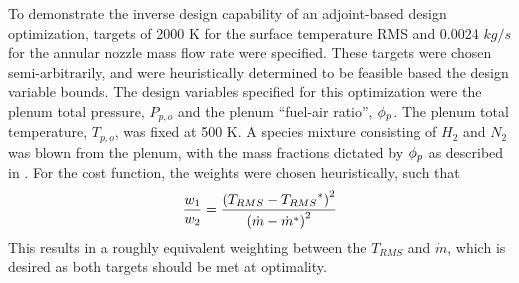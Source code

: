To demonstrate the inverse design capability of an adjoint-based design
optimization, targets of 2000 K for the surface temperature RMS and 0.0024
$kg/s$ for the annular nozzle mass flow rate were specified.  These targets were
chosen semi-arbitrarily, and were heuristically determined to be feasible based
the design variable bounds. The design variables specified for this optimization
were the plenum total pressure, $P_{p,o}$ and the plenum ``fuel-air ratio'',
$\phi_p$.  The plenum total temperature, $T_{p,o}$, was fixed at 500 K.  A species
mixture consisting of $H_2$ and $N_2$ was blown from the plenum, with the mass
fractions dictated by $\phi_p$ as described in .  For the cost
function, the weights were chosen heuristically, such that 
\begin{equation}
  \frac{w_1}{w_2} = \frac{\left( {T_{RMS}} - {T_{RMS}}^{*} \right)^2}{\left( {\dot{m}} - {\dot{m}}^{*} \right)^2}
  \label{weight-ratio}
\end{equation}
This results in a roughly equivalent weighting between the $T_{RMS}$ and
$\dot{m}$, which is desired as both targets should be met at optimality.
